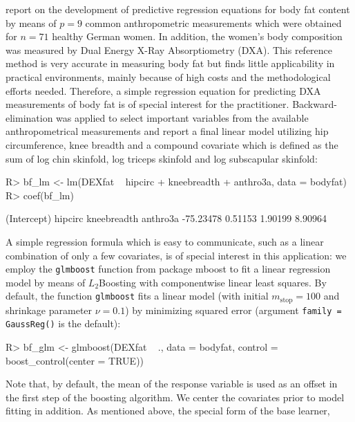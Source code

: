 \documentclass{article}
\newcommand{\Rpackage}[1]{{\normalfont\fontseries{b}\selectfont #1}}
\newcommand{\Rcmd}[1]{\texttt{#1}}
\newenvironment{Schunk}{}{}
\begin{document}
\citet{garcia2005} report on the development of predictive regression equations
for body fat content by means of $p = 9$ common anthropometric
measurements which were obtained for $n = 71$ healthy German women. 
In addition, the women's body composition was measured by 
Dual Energy X-Ray Absorptiometry (DXA). This reference method 
is very accurate in measuring body fat but finds little applicability
in practical environments, mainly because of high costs and the 
methodological efforts needed. Therefore, a simple regression equation 
for predicting DXA measurements of body fat is of special interest for the practitioner. 
Backward-elimination was applied to select
important variables from the available anthropometrical measurements and
\citet{garcia2005} report a final linear model utilizing
hip circumference, knee breadth and a compound covariate which is defined as
the sum of log chin skinfold, log triceps skinfold and log subscapular skinfold:
\begin{Schunk}
\begin{Sinput}
R> bf_lm <- lm(DEXfat ~ hipcirc + kneebreadth + anthro3a, 
         data = bodyfat)
R> coef(bf_lm)
\end{Sinput}
\begin{Soutput}
(Intercept)     hipcirc kneebreadth    anthro3a 
  -75.23478     0.51153     1.90199     8.90964 
\end{Soutput}
\end{Schunk}
A simple regression formula which is easy to communicate, such as a 
linear combination of only a few covariates, is of special interest in this 
application: we employ the \Rcmd{glmboost} function from package 
\Rpackage{mboost}
to fit a linear regression model by means of $L_2$Boosting with componentwise
linear least squares. By default, the function \Rcmd{glmboost} fits a linear model (with 
initial $m_\text{stop} = 100$ and shrinkage parameter $\nu = 0.1$) by
minimizing squared error (argument \Rcmd{family = GaussReg()} is 
the default): 
\begin{Schunk}
\begin{Sinput}
R> bf_glm <- glmboost(DEXfat ~ ., data = bodyfat, 
         control = boost_control(center = TRUE))
\end{Sinput}
\end{Schunk}
Note that, by default, the mean of the response variable is used as an
offset in the first step of the boosting algorithm. We center the covariates
prior to model fitting in addition.
As mentioned above, the special form of the base learner,
\end{document}
